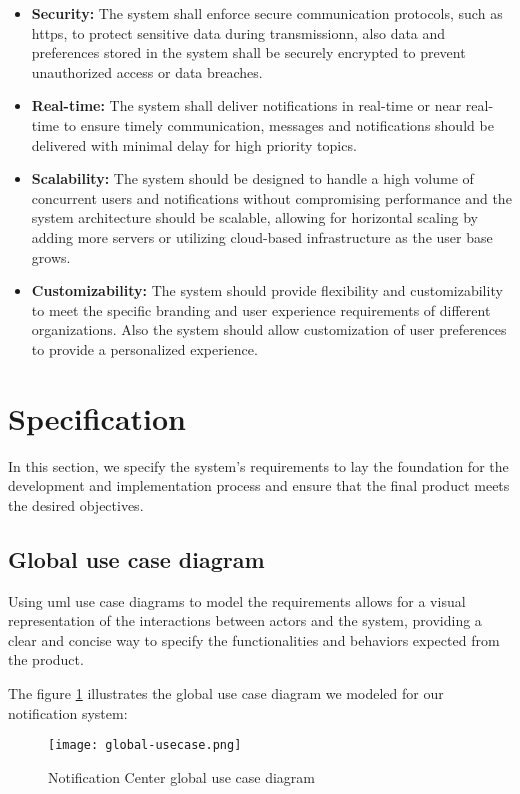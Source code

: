 \begin{itemize}
    \item \textbf{Security:} The system shall enforce secure communication protocols, such as \acrshort{https}, 
    to protect sensitive data during transmissionn, also data and preferences stored in the system shall be securely 
    encrypted to prevent unauthorized access or data breaches.
    \item \textbf{Real-time:} The system shall deliver notifications in real-time or near real-time 
    to ensure timely communication, messages and notifications should be delivered with minimal delay for high 
    priority topics.
    \item \textbf{Scalability:} The system should be designed to handle a high volume of concurrent users 
    and notifications without compromising performance and the system architecture should be scalable, allowing for 
    horizontal scaling by adding more servers or utilizing cloud-based infrastructure as the user base grows.
    \item \textbf{Customizability:} The system should provide flexibility and customizability to meet 
    the specific branding and user experience requirements of different organizations. Also the system should 
    allow customization of user preferences to provide a personalized experience.
\end{itemize}

\section{Specification}
\label{spec}
In this section, we specify the system's requirements to lay the foundation for the development 
and implementation process and ensure that the final product meets the desired objectives.

\subsection{Global use case diagram}
Using \acrshort{uml} use case diagrams to model the requirements allows for a visual representation 
of the interactions between actors and the system, providing a clear and concise way to specify 
the functionalities and behaviors expected from the product.

The figure \ref{g-usecase} illustrates the global use case diagram we modeled for our notification system:

\begin{figure}[h!]
    \centering
    \texttt{[image: global-usecase.png]}
    \caption{Notification Center global use case diagram}
    \label{g-usecase}
\end{figure}

